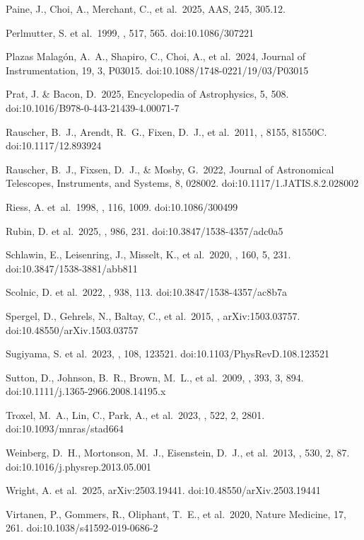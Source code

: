 \documentclass[]{pasj01}
\begin{document}
\begin{thebibliography}{}
 Paine, J., Choi, A., Merchant, C., et al.\ 2025, AAS, 245, 305.12. 

 Perlmutter, S. et al.\ 1999, \apj, 517, 565. doi:10.1086/307221

 Plazas Malag{\'o}n, A.~A., Shapiro, C., Choi, A., et al.\ 2024, Journal of Instrumentation, 19, 3, P03015. doi:10.1088/1748-0221/19/03/P03015

 Prat, J. \& Bacon, D.\ 2025, Encyclopedia of Astrophysics, 5, 508. doi:10.1016/B978-0-443-21439-4.00071-7

 Rauscher, B.~J., Arendt, R.~G., Fixen, D.~J., et al.\ 2011, \procspie, 8155, 81550C. doi:10.1117/12.893924

 Rauscher, B.~J., Fixsen, D.~J., \& Mosby, G.\ 2022, Journal of Astronomical Telescopes, Instruments, and Systems, 8, 028002. doi:10.1117/1.JATIS.8.2.028002

 Riess, A. et~al.\ 1998, \aj, 116, 1009. doi:10.1086/300499

 Rubin, D. et al.\ 2025, \apj, 986, 231. doi:10.3847/1538-4357/adc0a5

 Schlawin, E., Leisenring, J., Misselt, K., et al.\ 2020, \aj, 160, 5, 231. doi:10.3847/1538-3881/abb811

 Scolnic, D. et al.\ 2022, \apj, 938, 113. doi:10.3847/1538-4357/ac8b7a

 Spergel, D., Gehrels, N., Baltay, C., et al.\ 2015, , arXiv:1503.03757. doi:10.48550/arXiv.1503.03757

 Sugiyama, S. et al.\ 2023, \prd, 108, 123521. doi:10.1103/PhysRevD.108.123521

 Sutton, D., Johnson, B.~R., Brown, M.~L., et al.\ 2009, \mnras, 393, 3, 894. doi:10.1111/j.1365-2966.2008.14195.x

 Troxel, M.~A., Lin, C., Park, A., et al.\ 2023, \mnras, 522, 2, 2801. doi:10.1093/mnras/stad664

 Weinberg, D.~H., Mortonson, M.~J., Eisenstein, D.~J., et al.\ 2013, \physrep, 530, 2, 87. doi:10.1016/j.physrep.2013.05.001

 Wright, A. et al.\ 2025, arXiv:2503.19441. doi:10.48550/arXiv.2503.19441

 Virtanen, P., Gommers, R., Oliphant, T.~E., et al.\ 2020, Nature Medicine, 17, 261. doi:10.1038/s41592-019-0686-2


\end{thebibliography}
\end{document}
